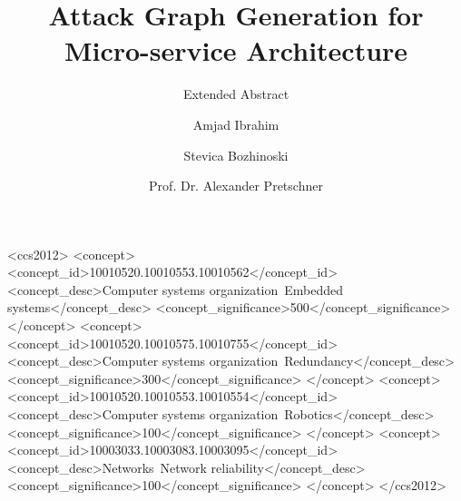 \documentclass[sigconf]{acmart}
\begin{document}
\title{Attack Graph Generation for Micro-service
	Architecture}
\subtitle{Extended Abstract}

\author{Amjad Ibrahim}

\author{Stevica Bozhinoski}

\author{Prof. Dr. Alexander Pretschner}

\renewcommand{\shortauthors}{B. Trovato et al.}


\begin{abstract}
	


\end{abstract}

%
%
\begin{CCSXML}
<ccs2012>
 <concept>
  <concept_id>10010520.10010553.10010562</concept_id>
  <concept_desc>Computer systems organization~Embedded systems</concept_desc>
  <concept_significance>500</concept_significance>
 </concept>
 <concept>
  <concept_id>10010520.10010575.10010755</concept_id>
  <concept_desc>Computer systems organization~Redundancy</concept_desc>
  <concept_significance>300</concept_significance>
 </concept>
 <concept>
  <concept_id>10010520.10010553.10010554</concept_id>
  <concept_desc>Computer systems organization~Robotics</concept_desc>
  <concept_significance>100</concept_significance>
 </concept>
 <concept>
  <concept_id>10003033.10003083.10003095</concept_id>
  <concept_desc>Networks~Network reliability</concept_desc>
  <concept_significance>100</concept_significance>
 </concept>
</ccs2012>  
\end{CCSXML}





\maketitle









 
\end{document}
